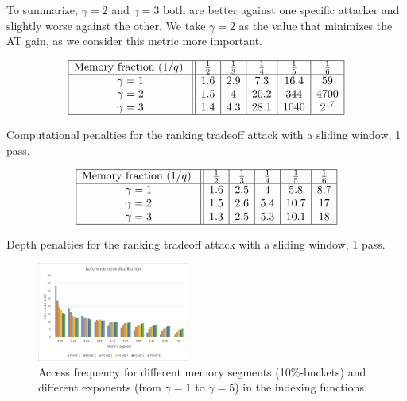 \documentclass[a4paper]{article}
\begin{document}
To summarize, $\gamma=2$ and $\gamma=3$ both are better against one specific attacker and slightly worse against the other. We take $\gamma=2$ as the value that minimizes the AT gain, as we consider this metric more important. 

 \begin{table}[ht]
\renewcommand{\arraystretch}{1.3}
$$
\begin{array}{|c||c|c|c|c|c|}
\hline
\text{Memory fraction ($1/q$) } &\frac{1}{2} &\frac{1}{3} &\frac{1}{4}&\frac{1}{5} &\frac{1}{6}\\
\hline
\gamma=1 & 1.6 & 2.9 & 7.3 & 16.4 & 59\\
\gamma=2 & 1.5 & 4 & 20.2 & 344 & 4700\\
\gamma=3 &1.4& 4.3& 28.1 &1040 & 2^{17}\\
\hline
\end{array}
$$
\caption{Computational penalties for the ranking tradeoff attack with a sliding window, 1 pass.}\label{tab:comp-alpha}
\end{table}

 \begin{table}[ht]
\renewcommand{\arraystretch}{1.3}
$$
\begin{array}{|c||c|c|c|c|c|}
\hline
\text{Memory fraction ($1/q$) } &\frac{1}{2} &\frac{1}{3} &\frac{1}{4}&\frac{1}{5} &\frac{1}{6}\\
\hline
\gamma=1 & 1.6 & 2.5 & 4 & 5.8 & 8.7\\
\gamma=2 & 1.5 & 2.6 & 5.4 & 10.7 & 17\\
\gamma=3 &1.3& 2.5& 5.3 &10.1 & 18\\
\hline
\end{array}
$$
\caption{Depth penalties for the ranking tradeoff attack with a sliding window, 1 pass.}\label{tab:depth-alpha}
\end{table}

\begin{figure}[hb]
\begin{center}
\includegraphics[width=5cm]{pics/power-distribution.jpg}
\end{center}
\caption{Access frequency for different memory segments (10\%-buckets) and different exponents (from $\gamma=1$ to $\gamma=5$) in the indexing functions.}\label{fig:histo}
\end{figure}
\end{document}

